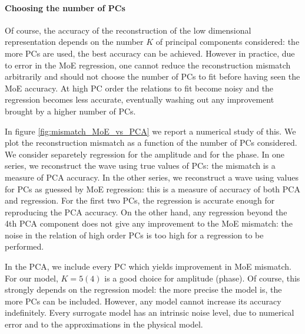 \paragraph{Choosing the number of PCs}
Of course, the accuracy of the reconstruction of the low dimensional representation depends on the number $K$ of principal components considered: the more PCs are used, the best accuracy can be achieved.
However in practice, due to error in the MoE regression, one cannot reduce the reconstruction mismatch arbitrarily and should not choose the number of PCs to fit before having seen the MoE accuracy.
At high PC order the relations to fit become noisy and the regression becomes less accurate, eventually washing out any improvement brought by a higher number of PCs.
\par
In figure \ref{fig:mismatch_MoE_vs_PCA} we report a numerical study of this. We plot the reconstruction mismatch as a function of the number of PCs considered. We consider separetely regression for the amplitude and for the phase. In one series, we reconstruct the wave using true values of PCs: the mismatch is a measure of PCA accuracy. In the other series, we reconstruct a wave using values for PCs as guessed by MoE regression: this is a measure of accuracy of both PCA and regression.
For the first two PCs, the regression is accurate enough for reproducing the PCA accuracy.
On the other hand, any regression beyond the 4th PCA component does not give any improvement to the MoE mismatch: the noise in the relation of high order PCs is too high for a regression to be performed.
\par
In the PCA, we include every PC which yields improvement in MoE mismatch. For our model, $K = 5(4)$ is a good choice for amplitude (phase).
Of course, this strongly depends on the regression model: the more precise the model is, the more PCs can be included.
However, any model cannot increase its accuracy indefinitely. Every surrogate model has an intrinsic noise level, due to numerical error and to the approximations in the physical model.
